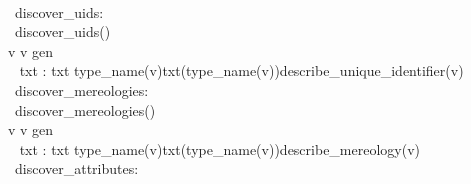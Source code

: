 \pos{\psno}{\mnewfoil}

\vspace{1mm}
 
%
\LLLL
\label{DiscoverySchema3}
\pos{\small}{\Large}
\bp
{}\\
\>\ discover\_uids:  {\RIGHTARROW} \\
\>\ discover\_uids() {\IS} \label{discover-uids}\\
\>\>\> {\ALL} v {\RDOT} v {\ISIN} gen \\
\>\>\>\>\  txt :{\EQ} txt {\DAGGER} {\LBRACKET}type\_name(v){\MAPSTO}txt(type\_name(v)){\CONCAT}{\LANGLE}describe\_unique\_identifier(v){\RANGLE}{\RBRACKET} \\
\>\ discover\_mereologies:  {\RIGHTARROW} \\
\>\ discover\_mereologies() {\IS} \label{discover-mereologies}\\
\>\>\> {\ALL} v {\RDOT} v {\ISIN} gen \\
\>\>\>\>\  txt :{\EQ} txt {\DAGGER} {\LBRACKET}type\_name(v){\MAPSTO}txt(type\_name(v)){\CONCAT}{\LANGLE}describe\_mereology(v){\RANGLE}{\RBRACKET} \\
\>\ discover\_attributes:  {\RIGHTARROW} \\
